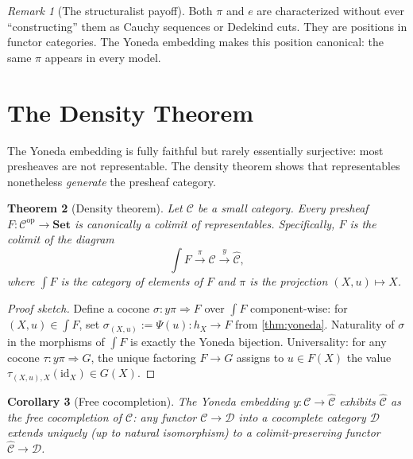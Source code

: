 \documentclass[12pt]{article}
\newtheorem{theorem}{Theorem}[section]
\newtheorem{corollary}[theorem]{Corollary}
\theoremstyle{definition}
\theoremstyle{remark}
\newtheorem{remark}[theorem]{Remark}
\begin{document}
\begin{remark}[The structuralist payoff]
Both $\pi$ and $e$ are characterized without ever ``constructing'' them as Cauchy sequences or Dedekind cuts. They are positions in functor categories. The Yoneda embedding makes this position canonical: the same $\pi$ appears in every model.
\end{remark}

\section{The Density Theorem}
\label{sec:density}

The Yoneda embedding is fully faithful but rarely essentially surjective: most presheaves are not representable. The density theorem shows that representables nonetheless \emph{generate} the presheaf category.

\begin{theorem}[Density theorem]
\label{thm:density}
Let $\mathcal{C}$ be a small category. Every presheaf $F\colon \mathcal{C}^{\mathrm{op}} \to \mathbf{Set}$ is canonically a colimit of representables. Specifically, $F$ is the colimit of the diagram
\[
\int F \xrightarrow{\;\pi\;} \mathcal{C} \xrightarrow{\;y\;} \widehat{\mathcal{C}},
\]
where $\int F$ is the category of elements of $F$ and $\pi$ is the projection $(X, u) \mapsto X$.
\end{theorem}

\begin{proof}[Proof sketch]
Define a cocone $\sigma\colon y \pi \Rightarrow F$ over $\int F$ component-wise: for $(X, u) \in \int F$, set $\sigma_{(X, u)} := \Psi(u)\colon h_X \to F$ from \cref{thm:yoneda}. Naturality of $\sigma$ in the morphisms of $\int F$ is exactly the Yoneda bijection. Universality: for any cocone $\tau\colon y\pi \Rightarrow G$, the unique factoring $F \to G$ assigns to $u \in F(X)$ the value $\tau_{(X, u), X}(\mathrm{id}_X) \in G(X)$.
\end{proof}

\begin{corollary}[Free cocompletion]
\label{cor:free-cocompletion}
The Yoneda embedding $y\colon \mathcal{C} \to \widehat{\mathcal{C}}$ exhibits $\widehat{\mathcal{C}}$ as the \emph{free cocompletion} of $\mathcal{C}$: any functor $\mathcal{C} \to \mathcal{D}$ into a cocomplete category $\mathcal{D}$ extends uniquely (up to natural isomorphism) to a colimit-preserving functor $\widehat{\mathcal{C}} \to \mathcal{D}$.
\end{corollary}
\end{document}
